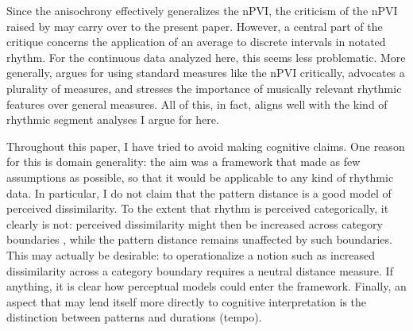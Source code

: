\documentclass{tMAM2e}%
\theoremstyle{plain}
\theoremstyle{definition}
\theoremstyle{remark}
\begin{document}

Since the anisochrony effectively generalizes the nPVI, the criticism of the nPVI raised by \citet{Condit-Schultz2019MusicPercept} may carry over to the present paper. 
However, a central part of the critique concerns the application of an average to discrete intervals in notated rhythm. 
For the continuous data analyzed here, this seems less problematic. 
More generally, \citet{Condit-Schultz2019MusicPercept} argues for using standard measures like the nPVI critically, advocates a plurality of measures, and stresses the importance of musically relevant rhythmic features over general measures. 
All of this, in fact, aligns well with the kind of rhythmic segment analyses I argue for here.


Throughout this paper, I have tried to avoid making cognitive claims. 
One reason for this is domain generality: the aim was a framework that made as few assumptions as possible, so that it would be applicable to any kind of rhythmic data. 
In particular, I do not claim that the pattern distance is a good model of perceived dissimilarity. 
To the extent that rhythm is perceived categorically, it clearly is not: perceived dissimilarity might then be increased across category boundaries \citep{Desain2003Perception},
while the pattern distance remains unaffected by such boundaries. 
This may actually be desirable: to operationalize a notion such as increased dissimilarity across a category boundary requires a neutral distance measure. 
If anything, it is clear how perceptual models could enter the framework. 
Finally, an aspect that may lend itself more directly to cognitive interpretation is the distinction between patterns and durations (tempo).

\end{document}
